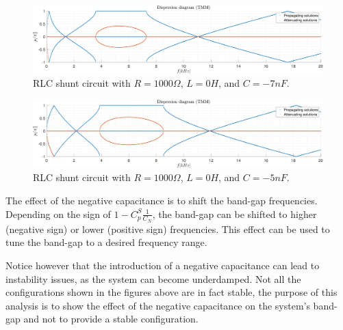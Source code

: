\begin{figure}[H]
    \centering
    \includegraphics[width=\textwidth]{./img/MATLAB/TMM_ON-ON-ON_RLC_R1000_L0_C-7e-09.pdf}
    \caption{RLC shunt circuit with $R = 1000 \Omega$, $L = 0 H$, and $C = -7 nF$.}
    \label{fig:TMM_ON-ON-ON_RLC_R1000_L0_C-7e-09.pdf}
\end{figure}

\begin{figure}[H]
    \centering
    \includegraphics[width=\textwidth]{./img/MATLAB/TMM_ON-ON-ON_RLC_R1000_L0_C-5e-09.pdf}
    \caption{RLC shunt circuit with $R = 1000 \Omega$, $L = 0 H$, and $C = -5 nF$.}
    \label{fig:TMM_ON-ON-ON_RLC_R1000_L0_C-5e-09.pdf}
\end{figure}

The effect of the negative capacitance is to shift the band-gap frequencies.
Depending on the sign of $1 - C_p^S \frac{1}{C_N}$, the band-gap can be shifted to higher (negative sign) or lower (positive sign) frequencies.
This effect can be used to tune the band-gap to a desired frequency range.

Notice however that the introduction of a negative capacitance can lead to instability issues, as the system can become underdamped.
Not all the configurations shown in the figures above are in fact stable, the purpose of this analysis is to show the effect of the negative capacitance on the system's band-gap and not to provide a stable configuration.




